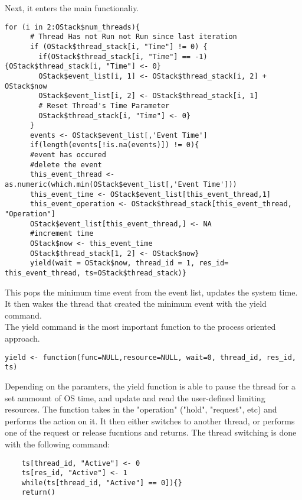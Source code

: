 \documentclass[fleqn]{article}
\begin{document}
Next, it enters the main functionaliy. 
\begin{lstlisting}
for (i in 2:OStack$num_threads){
      # Thread Has not Run not Run since last iteration
      if (OStack$thread_stack[i, "Time"] != 0) {
        if(OStack$thread_stack[i, "Time"] == -1){OStack$thread_stack[i, "Time"] <- 0}
        OStack$event_list[i, 1] <- OStack$thread_stack[i, 2] + OStack$now
        OStack$event_list[i, 2] <- OStack$thread_stack[i, 1]
        # Reset Thread's Time Parameter
        OStack$thread_stack[i, "Time"] <- 0}
      }
      events <- OStack$event_list[,'Event Time']
      if(length(events[!is.na(events)]) != 0){
      #event has occured
      #delete the event
      this_event_thread <- as.numeric(which.min(OStack$event_list[,'Event Time']))
      this_event_time <- OStack$event_list[this_event_thread,1]
      this_event_operation <- OStack$thread_stack[this_event_thread, "Operation"]
      OStack$event_list[this_event_thread,] <- NA
      #increment time
      OStack$now <- this_event_time
      OStack$thread_stack[1, 2] <- OStack$now}
      yield(wait = OStack$now, thread_id = 1, res_id= this_event_thread, ts=OStack$thread_stack)}
\end{lstlisting}

This pops the minimum time event from the event list, updates the system time. It then wakes the thread that created the minimum event with the yield command.\\

The yield command is the most important function to the process oriented approach.

\begin{lstlisting}
yield <- function(func=NULL,resource=NULL, wait=0, thread_id, res_id, ts)
\end{lstlisting}

Depending on the paramters, the yield function is able to pause the thread for a set ammount of OS time, and update and read the user-defined limiting resources. The function takes in the "operation" ("hold", "request", etc) and performs the action on it. It then either switches to another thread, or performs one of the request or release fucntions and returns. The thread switching is done with the following command:

\begin{lstlisting}
	ts[thread_id, "Active"] <- 0
    ts[res_id, "Active"] <- 1
    while(ts[thread_id, "Active"] == 0]){}
    return()
\end{lstlisting}
\end{document}
